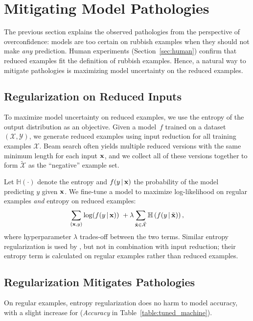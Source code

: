 \section{Mitigating Model Pathologies}
\label{sec:entropy_training}

The previous section explains the observed pathologies from the perspective of
overconfidence: models are too certain on rubbish examples when they should not make
\emph{any} prediction. Human experiments (Section~\ref{sec:human})
confirm that reduced examples fit the definition of rubbish examples. Hence, a
natural way to mitigate pathologies is maximizing model uncertainty on the
reduced examples.

\subsection{Regularization on Reduced Inputs}

To maximize model uncertainty on reduced examples, we use the entropy of the output
distribution as an objective.  Given a model~$f$ trained on a
dataset~$(\mathcal{X}, \mathcal{Y})$, we generate reduced examples
using input reduction
for all training examples $\mathcal{X}$. Beam search often yields multiple
reduced versions with the same minimum length for each input $\boldsymbol{\mathbf{x}}$, and we
collect all of these versions together to form $\tilde{\mathcal{X}}$ as the
``negative'' example set.

Let $\mathbb{H}\left(\cdot\right)$ denote the entropy and $f(y \, | \, \boldsymbol{\mathbf{x}})$
the probability of the model predicting $y$ given $\boldsymbol{\mathbf{x}}$.
We fine-tune a model to
maximize log-likelihood on regular examples \emph{and}
entropy on reduced examples: \begin{equation}
\sum_{(\boldsymbol{\mathbf{x}}, y)}\log(f(y \, | \, \boldsymbol{\mathbf{x}})) \
+ \lambda\sum_{\tilde{\boldsymbol{\mathbf{x}}}\in \tilde{\mathcal{X}}}
\mathbb{H}\left(f(y \, | \, \tilde{\boldsymbol{\mathbf{x}}})\right), \label{regularizer}
\end{equation}
where hyperparameter $\lambda$ trades-off between the two
terms. Similar entropy regularization is used by
\citet{pereyra2017regularizing}, but not in combination with input
reduction; their entropy term is calculated on regular examples rather
than reduced examples.

\subsection{Regularization Mitigates Pathologies}

On regular examples, entropy regularization does no harm to model accuracy, with
a slight increase for \squad{} (\emph{Accuracy} in
Table~\ref{table:tuned_machine}).

